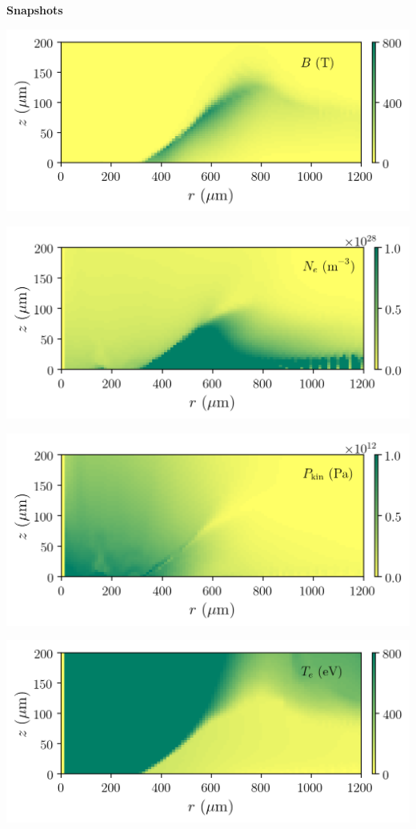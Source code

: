 \documentclass{report}
\begin{document}
{\bf Snapshots}

\begin{center}
\includegraphics[width=0.8\linewidth]{lmj2019-B.png}
\end{center}

\begin{center}
\includegraphics[width=0.8\linewidth]{lmj2019-Ne.png}
\end{center}

\begin{center}
\includegraphics[width=0.8\linewidth]{lmj2019-P.png}
\end{center}

\begin{center}
\includegraphics[width=0.8\linewidth]{lmj2019-Te.png}
\end{center}
\end{document}

